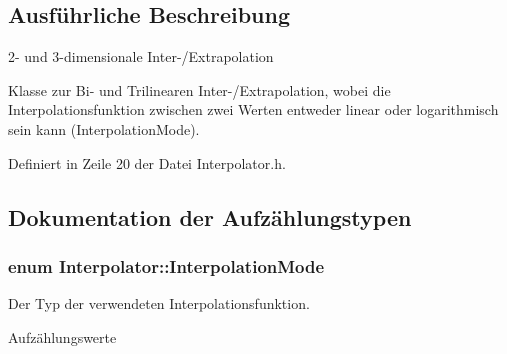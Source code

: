 \subsection{Ausführliche Beschreibung}
2-\/ und 3-\/dimensionale Inter-\//\-Extrapolation 

Klasse zur Bi-\/ und Trilinearen Inter-\//\-Extrapolation, wobei die Interpolationsfunktion zwischen zwei Werten entweder linear oder logarithmisch sein kann (Interpolation\-Mode). 

Definiert in Zeile 20 der Datei Interpolator.\-h.



\subsection{Dokumentation der Aufzählungstypen}
\hypertarget{classInterpolator_adb733b1439a2903feae57fa734ced0c2}{
\subsubsection[{Interpolation\-Mode}]{\setlength{\rightskip}{0pt plus 5cm}enum {\bf Interpolator\-::\-Interpolation\-Mode}}}\label{classInterpolator_adb733b1439a2903feae57fa734ced0c2}


Der Typ der verwendeten Interpolationsfunktion. 

\begin{Desc}
\item[Aufzählungswerte]\par
\begin{description}
\item[{\em 
\hypertarget{classInterpolator_adb733b1439a2903feae57fa734ced0c2a3a3f536edbfcc38cea69d59eb5709769}{L\-I\-N\-E\-A\-R}\label{classInterpolator_adb733b1439a2903feae57fa734ced0c2a3a3f536edbfcc38cea69d59eb5709769}
}]\item[{\em 
\hypertarget{classInterpolator_adb733b1439a2903feae57fa734ced0c2aa7167350eb8c3b4e2d5cb800587a725b}{L\-O\-G\-A\-R\-I\-T\-H\-M\-I\-C}\label{classInterpolator_adb733b1439a2903feae57fa734ced0c2aa7167350eb8c3b4e2d5cb800587a725b}
}]\end{description}
\end{Desc}


